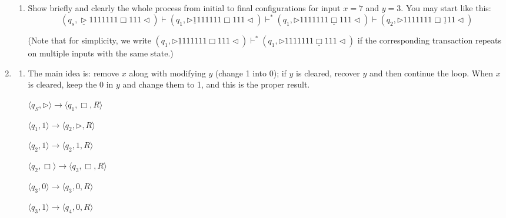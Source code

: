 \documentclass[12pt,a4paper]{article}
\makeatletter
\newtheorem*{solution}{Solution}
\theoremstyle{definition}
\renewenvironment{solution}[1][Solution] {\par\pushQED{\qed}\normalfont\topsep6\p@\@plus6\p@\relax\trivlist\item[\hskip\labelsep\bfseries#1\@addpunct{.}]\ignorespaces}{\popQED\endtrivlist\@endpefalse} \makeatother
\makeatother
\begin{document}
\begin{enumerate}
\begin{enumerate}
	\item
	Show briefly and clearly the whole process from initial to final configurations for input $x = 7$ and $y = 3$. You may start like this:
	$$(q_s,\underline{\triangleright}  1  1  1  1  1  1  1  \Box 1  1  1   \triangleleft)
	\vdash (q_1,\triangleright  \underline{1}  1  1  1  1  1  1  \Box 1  1  1   \triangleleft)
	\vdash^* (q_1,\triangleright  1  1  1  1  1  1  1  \underline{\Box} 1  1  1   \triangleleft)
	\vdash (q_2,\triangleright  1  1  1  1  1  1  1  \Box \underline{1}  1  1   \triangleleft)$$
	
	\par{\color{blue}(Note that for simplicity, we write $(q_1,\triangleright  \underline{1}  1  1  1  1  1  1  \Box 1  1  1   \triangleleft)\vdash^* (q_1,\triangleright  1  1  1  1  1  1  1  \underline{\Box} 1  1  1   \triangleleft)$ if the corresponding transaction repeats on multiple inputs with the same state.)}
	
\end{enumerate}

\begin{solution}
	\begin{enumerate}
		\item The main idea is: remove $ x $ along with modifying $ y $ (change 1 into 0); if $ y $ is cleared, recover $ y $ and then continue the loop. When $ x $ is cleared, keep the $ 0 $ in $ y $ and change them to 1, and this is the proper result.
		
		\hspace{2mm}
		\begin{minipage}{0.45\textwidth}
			\begin{center}
				
				$\langle q_S,\triangleright\rangle\rightarrow\langle q_1,\Box,R\rangle$
				
				
				$\langle q_1,1\rangle\rightarrow\langle q_2,\triangleright,R\rangle$
				
				
				$\langle q_2,1\rangle\rightarrow\langle q_2,1,R\rangle$
				
				$\langle q_2,\Box\rangle\rightarrow\langle q_3,\Box,R\rangle$
				
				
				$\langle q_3,0\rangle\rightarrow\langle q_3,0,R\rangle$
				
				$\langle q_3,1\rangle\rightarrow\langle q_4,0,R\rangle$
				

\end{center}
\end{minipage}
\end{enumerate}
\end{solution}
\end{enumerate}
\end{document}
